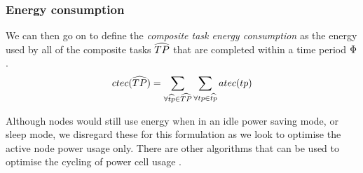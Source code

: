 \subsubsection{Energy consumption}
\newcommand{\functionSystemEnergyConsumption}[2]{
	\functionSignature{ctec}
	{\setCompositeTask{}{}}
}
We can then go on to define the \textit{composite task energy consumption} as the energy used by all of the composite tasks $\setCompositeTask{}{}$ that are completed within a time period $\Phi$.
\begin{equation}
	\functionSystemEnergyConsumption{}{} 
	= 
	\sum_{\forall \varCompositeTask{}{} \in \setCompositeTask{}{}}
	\sum_{\forall \varAtomicTask{}{} \in \varCompositeTask{}{}} \functionTaskEnergyConsumption{}{}
\end{equation}

Although nodes would still use energy when in an idle power saving mode, or sleep mode, we disregard these for this formulation as we look to optimise the active node power usage only. There are other algorithms that can be used to optimise the cycling of power cell usage \cite{DUMMY}.